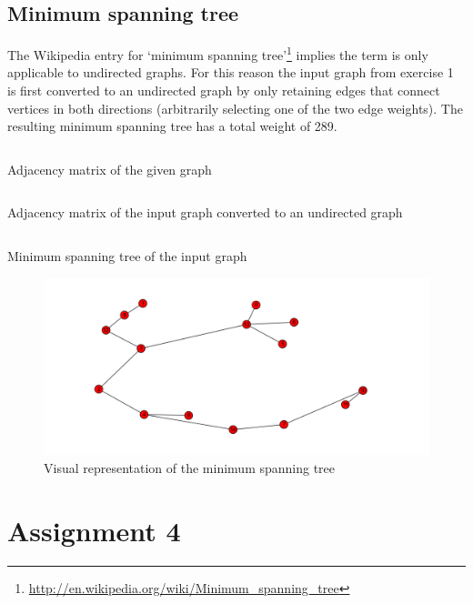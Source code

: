 \documentclass[a4paper,12px]{article}
\begin{document}
\subsection{Minimum spanning tree}

The Wikipedia entry for `minimum spanning
tree'\footnote{\url{http://en.wikipedia.org/wiki/Minimum\_spanning\_tree}}
implies the term is only applicable to undirected graphs. For this reason the
input graph from exercise 1 is first converted to an undirected graph by only
retaining edges that connect vertices in both directions (arbitrarily selecting
one of the two edge weights). The resulting minimum spanning tree has a total
weight of 289.

\begin{listing}[H]
    \inputminted[fontsize=\footnotesize]{text}{inputgraph}
    \caption{Adjacency matrix of the given graph}
\end{listing}

\begin{listing}[H]
    \inputminted[fontsize=\footnotesize]{text}{inputgraph2}
    \caption{Adjacency matrix of the input graph converted to an undirected graph}
\end{listing}

\begin{listing}[H]
    \inputminted[fontsize=\footnotesize]{text}{inputgraph3}
    \caption{Minimum spanning tree of the input graph}
\end{listing}

\begin{figure}[H]
    \centering
    \includegraphics[width=\textwidth]{figure_1.png}
    \caption{Visual representation of the minimum spanning tree}
\end{figure}

\section{Assignment 4}
\end{document}
